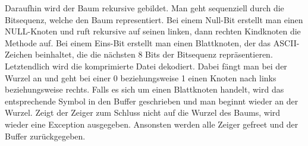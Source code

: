 \documentclass[course=erap]{aspdoc}
\begin{document}
Daraufhin wird der Baum rekursive gebildet. Man geht sequenziell durch die Bitsequenz, welche den Baum representiert. Bei einem Null-Bit erstellt man einen NULL-Knoten und ruft rekursive auf seinen linken, dann rechten Kindknoten die Methode auf. Bei einem Eins-Bit erstellt man einen Blattknoten, der das ASCII-Zeichen beinhaltet, die die nächsten 8 Bits der Bitsequenz repräsentieren. \\

Letztendlich wird die komprimierte Datei dekodiert. Dabei fängt man bei der Wurzel an und geht bei einer 0 beziehungsweise 1 einen Knoten nach links beziehungsweise rechts. Falls es sich um einen Blattknoten handelt, wird das entsprechende Symbol in den Buffer geschrieben und man beginnt wieder an der Wurzel. Zeigt der Zeiger zum Schluss nicht auf die Wurzel des Baums, wird wieder eine Exception ausgegeben.
Ansonsten werden alle Zeiger gefreet und der Buffer zurückgegeben.
\end{document}
